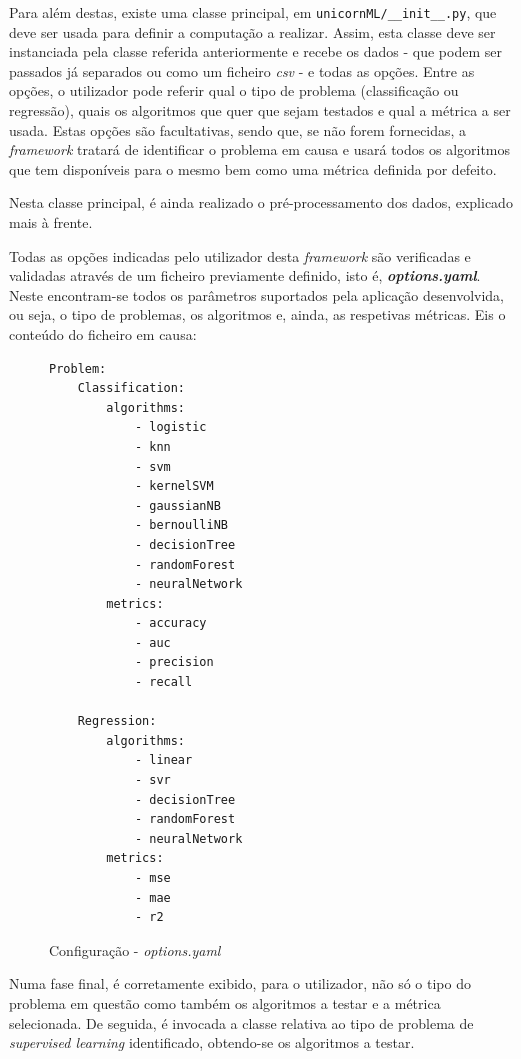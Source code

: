 \documentclass[a4paper]{report}
\begin{document}
{	Para além destas, existe uma classe principal, em \texttt{unicornML/\_\_init\_\_.py}, que deve ser usada para definir a computação a realizar.
	Assim, esta classe deve ser instanciada pela classe referida anteriormente e recebe os dados - que podem ser passados já separados ou como um ficheiro \textit{csv} - e todas as opções.
	Entre as opções, o utilizador pode referir qual o tipo de problema (classificação ou regressão), quais os algoritmos que quer que sejam testados e qual a métrica a ser usada.
	Estas opções são facultativas, sendo que, se não forem fornecidas, a \textit{framework} tratará de identificar o problema em causa e usará todos os algoritmos que tem disponíveis para o mesmo bem como uma métrica definida por defeito.

	Nesta classe principal, é ainda realizado o pré-processamento dos dados, explicado mais à frente.
    
    Todas as opções indicadas pelo utilizador desta \textit{framework} são verificadas e validadas através de um ficheiro previamente definido, isto é, \textbf{\textsl{options.yaml}}.
	Neste encontram-se todos os parâmetros suportados pela aplicação desenvolvida, ou seja, o tipo de problemas, os algoritmos e, ainda, as respetivas métricas.
	Eis o conteúdo do ficheiro em causa:
    \begin{figure}[H]
        \centering
        \begin{verbatim}
Problem:
    Classification:
        algorithms:
            - logistic
            - knn
            - svm
            - kernelSVM
            - gaussianNB
            - bernoulliNB
            - decisionTree
            - randomForest
            - neuralNetwork
        metrics:
            - accuracy
            - auc
            - precision
            - recall

    Regression:
        algorithms:
            - linear
            - svr
            - decisionTree
            - randomForest
            - neuralNetwork
        metrics:
            - mse
            - mae
            - r2
        \end{verbatim}
        \vspace{-5mm}
        \caption{Configuração - \textsl{options.yaml}}
        \label{fig:2}
	\end{figure}

		Numa fase final, é corretamente exibido, para o utilizador, não só o tipo do problema em questão como também os algoritmos a testar e a métrica selecionada.
		De seguida, é invocada a classe relativa ao tipo de problema de \textit{supervised learning} identificado, obtendo-se os algoritmos a testar.

}
\end{document}
